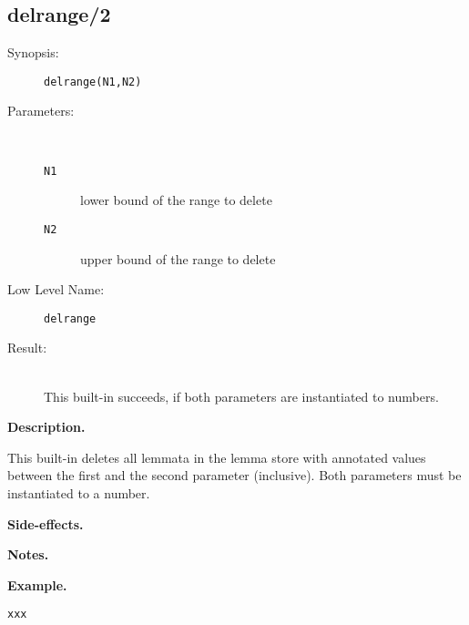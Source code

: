 %
%
%
\subsection{delrange/2}

\begin{description}
\item[Synopsis:]
	{\tt delrange(N1,N2)}
\item[Parameters:]\ \\[-0.5cm]
	\begin{description}
	\item[{\tt N1}]
lower bound of the range to delete
	\item[{\tt N2}]
upper bound of the range to delete
	\end{description}
\item[Low Level Name:]
	{\tt delrange}
\item[Result:]\ \\
This built-in succeeds, if both parameters are
instantiated to numbers.

\end{description}

\vspace*{0.5cm}
\noindent
{\bf Description.}

This built-in deletes all lemmata in the lemma store
with annotated values between the first and the second parameter
(inclusive).
Both parameters must be instantiated to a number.
 
\vspace*{0.5cm}
\noindent
{\bf Side-effects.}

\vspace*{0.5cm}
\noindent
{\bf Notes.}

\vspace*{0.5cm}
\noindent
{\bf Example.}
\begin{verbatim}
xxx
\end{verbatim}


